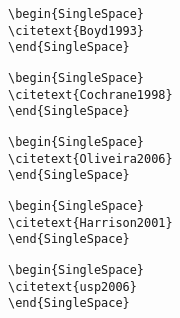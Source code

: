 \begin{alineas}

\begin{verbatim}
\begin{SingleSpace} 
\citetext{Boyd1993}
\end{SingleSpace}
\end{verbatim}


\begin{verbatim}
\begin{SingleSpace} 
\citetext{Cochrane1998}
\end{SingleSpace}
\end{verbatim}


\begin{verbatim}
\begin{SingleSpace} 
\citetext{Oliveira2006}
\end{SingleSpace}
\end{verbatim}


\begin{verbatim}
\begin{SingleSpace} 
\citetext{Harrison2001}
\end{SingleSpace}
\end{verbatim}


\begin{verbatim}
\begin{SingleSpace} 
\citetext{usp2006}
\end{SingleSpace}
\end{verbatim}


\quad


\end{alineas}
